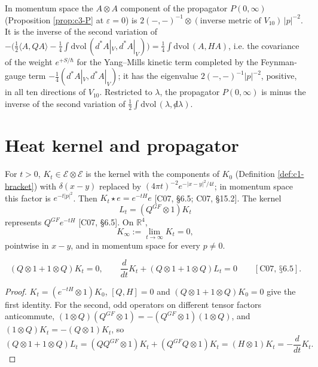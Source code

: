 \begin{remark}
\label{rem:c3-feynman}
In momentum space the $A\otimes A$ component of the propagator $P(0,\infty)$ (Proposition \ref{prop:c3-P} at $\varepsilon=0$) is $2(-,-)^{-1}\otimes(\text{inverse metric of }V_{10})\,|p|^{-2}$. It is the inverse of the second variation of $-\big(\tfrac12\langle A,QA\rangle-\tfrac14\int\mathrm{dvol}\,(d^*A|_V,d^*A|_V)\big)=\tfrac14\int\mathrm{dvol}\,(A,HA)$, i.e. the covariance of the weight $e^{+S/\hbar}$ for the Yang--Mills kinetic term completed by the Feynman-gauge term $-\tfrac14(d^*A|_V,d^*A|_V)$; it has the eigenvalue $2(-,-)^{-1}|p|^{-2}$, positive, in all ten directions of $V_{10}$. Restricted to $\lambda$, the propagator $P(0,\infty)$ is minus the inverse of the second variation of $\tfrac12\int\mathrm{dvol}\,(\lambda,{\not d}\lambda)$.
\end{remark}

\section{Heat kernel and propagator}

\begin{definition}
\label{def:c3-K}
For $t>0$, $K_t\in\mathscr E\otimes\mathscr E$ is the kernel with the components of $K_0$ (Definition \ref{def:c1-bracket}) with $\delta(x-y)$ replaced by $(4\pi t)^{-2}e^{-|x-y|^2/4t}$; in momentum space this factor is $e^{-t|p|^2}$. Then $K_t\star e=e^{-tH}e$ [C07, §6.5; C07, §15.2]. The kernel
\[
L_t=(Q^{GF}\otimes1)K_t
\]
represents $Q^{GF}e^{-tH}$ [C07, §6.5]. On $\mathbb R^4$,
\[
K_\infty:=\lim_{t\to\infty}K_t=0,
\]
pointwise in $x-y$, and in momentum space for every $p\neq0$.
\end{definition}

\begin{proposition}
\label{prop:c3-heat}
\[
(Q\otimes1+1\otimes Q)K_t=0,\qquad \frac{d}{dt}K_t+(Q\otimes1+1\otimes Q)L_t=0\qquad[\text{C07, §6.5}].
\]
\end{proposition}

\begin{proof}
$K_t=(e^{-tH}\otimes1)K_0$, $[Q,H]=0$ and $(Q\otimes1+1\otimes Q)K_0=0$ give the first identity. For the second, odd operators on different tensor factors anticommute, $(1\otimes Q)(Q^{GF}\otimes1)=-(Q^{GF}\otimes1)(1\otimes Q)$, and $(1\otimes Q)K_t=-(Q\otimes1)K_t$, so
\[
(Q\otimes1+1\otimes Q)L_t=(QQ^{GF}\otimes1)K_t+(Q^{GF}Q\otimes1)K_t=(H\otimes1)K_t=-\frac{d}{dt}K_t .
\]
\end{proof}

